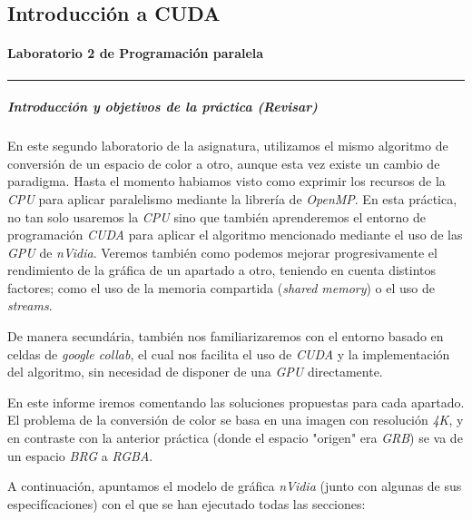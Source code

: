 \documentclass[
]{article}
\author{}
\date{}
\begin{document}
\hypertarget{introducciuxf3n-a-cuda}{%
\subsection{Introducción a CUDA}\label{introducciuxf3n-a-cuda}}

\hypertarget{laboratorio-2-de-programaciuxf3n-paralela}{%
\paragraph{Laboratorio 2 de Programación
paralela}\label{laboratorio-2-de-programaciuxf3n-paralela}}

\begin{center}\rule{0.5\linewidth}{0.5pt}\end{center}

\hypertarget{introducciuxf3n-y-objetivos-de-la-pruxe1ctica-revisar}{%
\subparagraph{Introducción y objetivos de la práctica
(Revisar)}\label{introducciuxf3n-y-objetivos-de-la-pruxe1ctica-revisar}}

En este segundo laboratorio de la asignatura, utilizamos el mismo
algoritmo de conversión de un espacio de color a otro, aunque esta vez
existe un cambio de paradigma. Hasta el momento habiamos visto como
exprimir los recursos de la \emph{CPU} para aplicar paralelismo mediante
la librería de \emph{OpenMP}. En esta práctica, no tan solo usaremos la
\emph{CPU} sino que también aprenderemos el entorno de programación
\emph{CUDA} para aplicar el algoritmo mencionado mediante el uso de las
\emph{GPU} de \emph{nVidia}. Veremos también como podemos mejorar
progresivamente el rendimiento de la gráfica de un apartado a otro,
teniendo en cuenta distintos factores; como el uso de la memoria
compartida (\emph{shared memory}) o el uso de \emph{streams}.

De manera secundária, también nos familiarizaremos con el entorno basado
en celdas de \emph{google collab}, el cual nos facilita el uso de
\emph{CUDA} y la implementación del algoritmo, sin necesidad de disponer
de una \emph{GPU} directamente.

En este informe iremos comentando las soluciones propuestas para cada
apartado. El problema de la conversión de color se basa en una imagen
con resolución \emph{4K}, y en contraste con la anterior práctica (donde
el espacio "origen" era \emph{GRB}) se va de un espacio \emph{BRG} a
\emph{RGBA}.

A continuación, apuntamos el modelo de gráfica \emph{nVidia} (junto con
algunas de sus especifícaciones) con el que se han ejecutado todas las
secciones:
\end{document}
